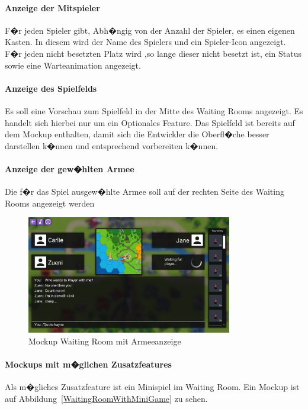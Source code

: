 \documentclass[12pt, titlepage]{scrartcl}
\newcommand{\Abb}[1]{%
	Abbildung\ \ref{#1}%
}
\begin{document}
		\paragraph{Anzeige der Mitspieler}
		F�r jeden Spieler gibt, Abh�ngig von der Anzahl der Spieler, es einen eigenen \glqq Kasten\grqq. In diesem wird der Name des Spielers und ein Spieler-Icon angezeigt. F�r jeden nicht besetzten Platz wird ,so lange dieser nicht besetzt ist, ein Status sowie eine Warteanimation angezeigt.  
		\paragraph{Anzeige des Spielfelds}
		Es soll eine Vorschau zum Spielfeld in der Mitte des Waiting Rooms angezeigt. Es handelt sich hierbei nur um ein Optionales Feature. Das Spielfeld ist bereits auf dem Mockup enthalten, damit sich die Entwickler die Oberfl�che besser darstellen k�nnen und entsprechend vorbereiten k�nnen.
		\paragraph{Anzeige der gew�hlten Armee}
		Die f�r das Spiel ausgew�hlte Armee soll auf der rechten Seite des Waiting Rooms angezeigt werden
		
		\begin{figure}[H] 
			\centering
			\includegraphics[width=0.8\textwidth]{Waiting_Room_Game_mit_ArmyView.png}
			\caption{Mockup Waiting Room mit Armeeanzeige}
			\label{WaitingRoomWithArmy}
		\end{figure}
	
		\paragraph{Mockups mit m�glichen Zusatzfeatures}
		Als m�gliches Zusatzfeature ist ein Minispiel im Waiting Room. Ein Mockup ist auf \Abb{WaitingRoomWithMiniGame} zu sehen.
		
\end{document}
